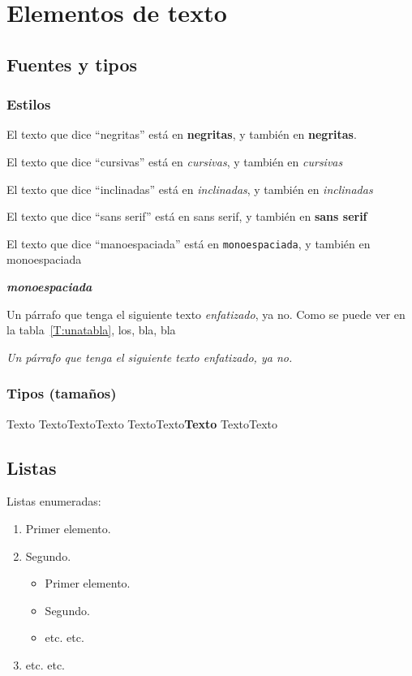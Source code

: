 \chapter{Elementos de texto}
\section{Fuentes y tipos}

\subsection*{Estilos}

 El texto que dice \enquote{negritas} está en \textbf{negritas}, y también en {\bfseries negritas}.
 
 El texto que dice \enquote{cursivas} está en \textit{cursivas}, y también en {\itshape cursivas}
 
 El texto que dice \enquote{inclinadas} está en \textsl{inclinadas}, y también en {\slshape inclinadas}

 El texto que dice \enquote{sans serif} está en \textsf{sans serif}, y también en {\sffamily \textbf{sans serif}}

 El texto que dice \enquote{manoespaciada} está en \texttt{monoespaciada}, y también en {\ttfamily monoespaciada}

 {\ttfamily \textit{\textbf{monoespaciada}}}

Un párrafo que tenga el siguiente texto \emph{enfatizado}, ya no. Como se puede ver en la tabla~\ref{T:unatabla}, los, bla, bla

\textit{Un párrafo que tenga el siguiente texto \emph{enfatizado}, ya no.
}

\subsection{Tipos (tamaños)}

{\tiny Texto}
{\footnotesize Texto}{\small Texto}{\normalsize Texto}
{\large Texto}{\Large Texto}{\LARGE\bfseries\sffamily Texto}
{\huge Texto}{\Huge Texto}


\section{Listas}

Listas enumeradas:
\begin{enumerate}
  \item Primer elemento.
  \item Segundo.
  \begin{itemize}
    \item Primer elemento.
    \item Segundo.
    \item etc. etc.
  \end{itemize}  
  \item etc. etc.
\end{enumerate}


\endinput
